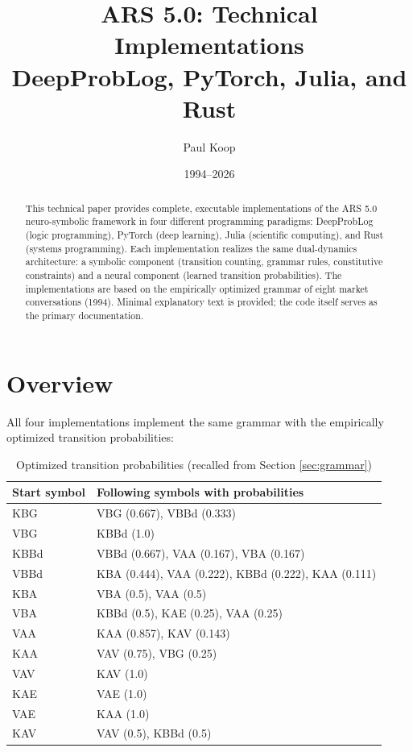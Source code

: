 \documentclass[10pt,a4paper]{article}
\title{\Huge\textbf{ARS 5.0: Technical Implementations} \\[2mm]
       \LARGE DeepProbLog, PyTorch, Julia, and Rust}
\author{
  \large
  \begin{tabular}{c}
    Paul Koop
  \end{tabular}
}
\date{\large 1994--2026}
\begin{document}
\maketitle

\begin{abstract}
This technical paper provides complete, executable implementations of the ARS 5.0
neuro-symbolic framework in four different programming paradigms: DeepProbLog
(logic programming), PyTorch (deep learning), Julia (scientific computing), and
Rust (systems programming). Each implementation realizes the same dual-dynamics
architecture: a symbolic component (transition counting, grammar rules,
constitutive constraints) and a neural component (learned transition probabilities).
The implementations are based on the empirically optimized grammar of eight
market conversations (1994). Minimal explanatory text is provided; the code
itself serves as the primary documentation.
\end{abstract}

\newpage
\tableofcontents
\newpage

\section{Overview}

All four implementations implement the same grammar with the empirically
optimized transition probabilities:

\begin{table}[H]
\centering
\caption{Optimized transition probabilities (recalled from Section \ref{sec:grammar})}
\label{tab:grammar}
\begin{tabular}{@{} l l @{}}
\toprule
\textbf{Start symbol} & \textbf{Following symbols with probabilities} \\
\midrule
KBG & VBG (0.667), VBBd (0.333) \\
VBG & KBBd (1.0) \\
KBBd & VBBd (0.667), VAA (0.167), VBA (0.167) \\
VBBd & KBA (0.444), VAA (0.222), KBBd (0.222), KAA (0.111) \\
KBA & VBA (0.5), VAA (0.5) \\
VBA & KBBd (0.5), KAE (0.25), VAA (0.25) \\
VAA & KAA (0.857), KAV (0.143) \\
KAA & VAV (0.75), VBG (0.25) \\
VAV & KAV (1.0) \\
KAE & VAE (1.0) \\
VAE & KAA (1.0) \\
KAV & VAV (0.5), KBBd (0.5) \\
\bottomrule
\end{tabular}
\end{table}
\end{document}
